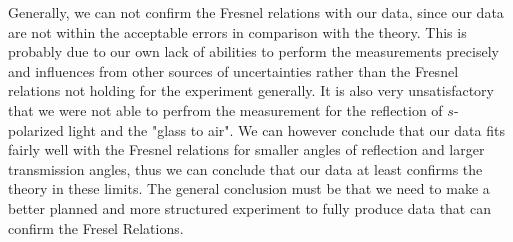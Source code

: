 Generally, we can not confirm the Fresnel relations with our data, since our data are not within the acceptable errors in comparison with the theory. This is probably due to our own lack of abilities to perform the measurements precisely and influences from other sources of uncertainties rather than the Fresnel relations not holding for the experiment generally. It is also very unsatisfactory that we were not able to perfrom the measurement for the reflection of $s$-polarized light and the "glass to air". We can however conclude that our data fits fairly well with the Fresnel relations for smaller angles of reflection and larger transmission angles, thus we can conclude that our data at least confirms the theory in these limits. The general conclusion must be that we need to make a better planned and more structured experiment to fully produce data that can confirm the Fresel Relations. 